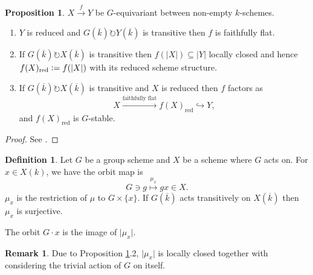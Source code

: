 \documentclass[10pt]{article}
\numberwithin{equation}{section}
\theoremstyle{definition}
\newtheorem{proposition}{Proposition}[section]
\newtheorem{definition}{Definition}[section]
\newtheorem{remark}{Remark}[section]
\newcommand{\defeq}{\vcentcolon=}
\newcommand{\ab}[1]{\vert #1 \vert}
\begin{document}
\begin{proposition}
    \label{proposition_28}
    $X\stackrel{f}{\to}Y$ be $G$-equivariant between non-empty $k$-schemes.
    \begin{enumerate}
        \item $Y$ is reduced and $G(\overline{k})\circlearrowright Y(\overline{k})$ is transitive then $f$ is faithfully flat.
        \item If $G(\overline{k})\circlearrowright X(\overline{k})$ is transitive then $f(\ab{X})\subseteq\ab{Y}$ locally closed and hence $f(X)_{\mathrm{red}}\defeq f(\ab{X})$ with its reduced scheme structure.
        \item If $G(\overline{k})\circlearrowright X(\overline{k})$ is transitive and $X$ is reduced then $f$ factors as 
        \begin{equation*}
            X\stackrel{\text{faithfully flat}}{\to}f(X)_{\mathrm{red}}\hookrightarrow Y,
        \end{equation*}
        and $f(X)_{\mathrm{red}}$ is $G$-stable.
    \end{enumerate}
\end{proposition}
\begin{proof}
    See \cite{Milne}.
\end{proof}

\begin{definition}
    \label{definition_29}
    Let $G$ be a group scheme and $X$ be a scheme where $G$ acts on. For $x\in X(k)$, we have the orbit map is 
    \begin{equation*}
        G\ni g\stackrel{\mu_x}{\mapsto} gx\in X.
    \end{equation*}
    $\mu_x$ is the restriction of $\mu$ to $G\times\{x\}$. If $G(\overline{k})$ acts transitively on $X(\overline{k})$ then $\mu_x$ is surjective.
    \par The orbit $G\cdot x$ is the image of $\ab{\mu_x}$. 
\end{definition}

\begin{remark}
    Due to Proposition \ref{proposition_28}.2, $\ab{\mu_x}$ is locally closed together with considering the trivial action of $G$ on itself.
\end{remark}
\end{document}
